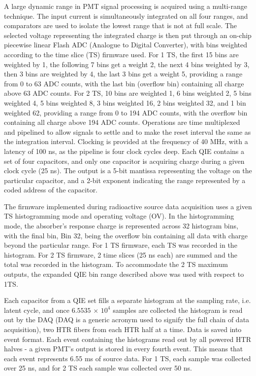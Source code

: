 A large dynamic range in PMT signal processing is acquired using
a multi-range technique. The input current is simultaneously integrated on all
four ranges, and comparators are used to isolate the lowest range that is not at
full scale. The selected voltage representing the integrated charge is then put
through an on-chip piecewise linear Flash ADC (Analogue to Digital Converter),
with bins weighted according to the time slice (TS) firmware used. For 1 TS, the first 15 bins are weighted by 1, the following 7 bins get a weight 2, the next 4 bins weighted by 3, then 3 bins are weighted by 4, the last 3 bins get a weight 5, providing a range from 0 to 63 ADC counts, with the last
bin (overflow bin) containing all charge above 63 ADC counts. For 2 TS, 10 bins
are weighted 1, 6 bins weighted 2, 5 bins weighted 4, 5 bins weighted 8, 3 bins
weighted 16, 2 bins weighted 32, and 1 bin weighted 62, providing a range from
0 to 194 ADC counts, with the overflow bin containing all charge above 194 ADC
counts. Operations are time multiplexed and pipelined to allow signals to
settle and to make the reset interval the same as the integration interval.
Clocking is provided at the frequency of 40 MHz, with a latency of
100 ns, as the pipeline is four clock cycles deep. Each QIE contains a
set of four capacitors, and only one capacitor is acquiring charge during a
given clock cycle (25 ns). The output is a 5-bit mantissa representing the voltage on
the particular capacitor, and a 2-bit exponent indicating the range
represented by a coded address of the capacitor.

The firmware implemented during radioactive source data acquisition uses a
given TS histogramming mode and operating voltage (OV). In the histogramming
mode, the absorber's response charge is represented across 32 histogram bins,
with the final bin, Bin 32, being the overflow bin containing all data with
charge beyond the particular range. For 1 TS firmware, each TS was recorded in
the histogram. For 2 TS firmware, 2 time slices (25 ns each) are summed and the total was recorded in the histogram. To accommodate
the 2 TS maximum outputs, the expanded QIE bin range described above was used
with respect to 1TS.

Each capacitor from a QIE set fills a separate histogram at the sampling rate,
i.e. latent cycle, and once $6.5535$ $\times$ $10^4$ samples are collected the histogram
is read out by the DAQ (DAQ is a generic acronym used to signify the full chain of data acquisition), two HTR fibers from each HTR half at a time. Data is
saved into event format. Each event containing the histograms read out by all powered HTR
halves - a given PMT's output is stored in every fourth event. This means
that each event represents 6.55 ms of source data. For 1 TS, each sample
was collected over 25 ns, and for 2 TS each sample was collected over
50 ns.